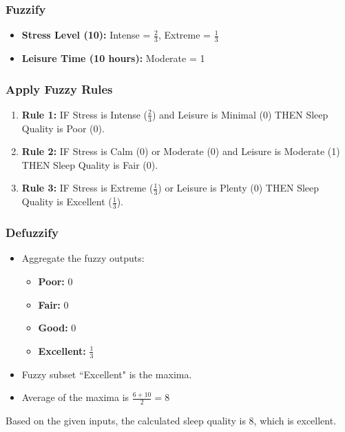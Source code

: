 \documentclass[12pt, a4paper]{article}
\begin{document}
\subsubsection*{Fuzzify}
\begin{itemize}
    \item \textbf{Stress Level (10):} Intense = $\frac{2}{3}$, Extreme = $\frac{1}{3}$
    \item \textbf{Leisure Time (10 hours):} Moderate = 1
\end{itemize}

\subsubsection*{Apply Fuzzy Rules}
\begin{enumerate}
    \item \textbf{Rule 1:} IF Stress is Intense ($\frac{2}{3}$) and Leisure is Minimal (0) THEN Sleep Quality is Poor (0).
    \item \textbf{Rule 2:} IF Stress is Calm (0) or Moderate (0) and Leisure is Moderate (1) THEN Sleep Quality is Fair (0).
    \item \textbf{Rule 3:} IF Stress is Extreme ($\frac{1}{3}$) or Leisure is Plenty (0) THEN Sleep Quality is Excellent ($\frac{1}{3}$).
\end{enumerate}

\subsubsection*{Defuzzify}
\begin{itemize}
    \item Aggregate the fuzzy outputs:
    \begin{itemize}
        \item \textbf{Poor:} 0
        \item \textbf{Fair:} 0
        \item \textbf{Good:} 0
        \item \textbf{Excellent:} $\frac{1}{3}$
    \end{itemize}
    \item Fuzzy subset ``Excellent" is the maxima.
    \item Average of the maxima is $\frac{6 + 10}{2} = 8$

\end{itemize}

Based on the given inputs, the calculated sleep quality is 8, which is excellent.
\end{document}

